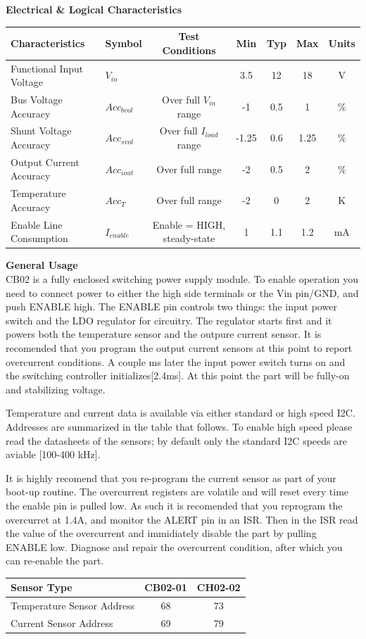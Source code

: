\documentclass{article}
\begin{document}
\large{\textbf{Electrical \& Logical Characteristics}} \\
\begin{center}
\begin{tabular}{|l | l |c| c|c|c|c|}
\hline
Characteristics & Symbol &Test Conditions & Min & Typ & Max & Units \\ \hline
Functional Input Voltage& $V_{in}$& & 3.5&12&18&V \\ \hline 
Bus Voltage Accuracy& $Acc_{bvol}$& Over full $V_{in}$ range&  -1&0.5&1&\% \\ \hline
Shunt Voltage Accuracy&$Acc_{svol}$& Over full $I_{load}$ range&-1.25&0.6&1.25&\% \\ \hline
Output Current Accuracy&$Acc_{iout}$&Over full range& -2&0.5&2&\% \\ \hline
Temperature Accuracy &$Acc_{T}$&Over full range& -2 &0&2& K\\ \hline
Enable Line Consumption &$I_{enable}$& Enable = HIGH, steady-state & 1 & 1.1 &1.2& mA\\ \hline
\hline
\end{tabular}
\end{center}
\large{\textbf{General Usage}} \\
CB02 is a fully enclosed switching power supply module. To enable operation you need to connect power to either the high side terminals or the Vin pin/GND, and push ENABLE high. The ENABLE pin controls two things: the input power switch and the LDO regulator for circuitry. The regulator starts first and it powers both the temperature sensor and the outpure current sensor. It is recomended that you program the output current sensors at this point to report overcurrent conditions.  A couple ms later the input power switch turns on and the switching controller initializes[2.4ms]. At this point the part will be fully-on and stabilizing voltage.

Temperature and current data is available via either standard or high speed I2C. Addresses are summarized in the table that follows. To enable high speed please read the datasheets of the sensors; by default only the standard I2C speeds are aviable [100-400 kHz].

It is highly recomend that you re-program the current sensor as part of your boot-up routine. The overcurrent registers are volatile and will reset every time the enable pin is pulled low. As such it is recomended that you reprogram the overcurret at 1.4A, and monitor the ALERT pin in an ISR. Then in the ISR read the value of the overcurrent and immidiately disable the part by pulling ENABLE low. Diagnose and repair the overcurrent condition, after which you can re-enable the part.

\begin{tabular}{|l|c|c|}
\hline
Sensor Type &CB02-01 &CH02-02\\ \hline
Temperature Sensor Address & 68 &73\\ \hline
Current Sensor Address&   69&  79 \\ \hline
\hline
\end{tabular}
\end{document}
